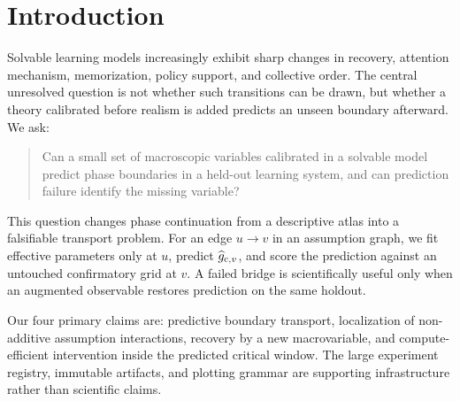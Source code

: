 \section{Introduction}

Solvable learning models increasingly exhibit sharp changes in recovery,
attention mechanism, memorization, policy support, and collective order.  The
central unresolved question is not whether such transitions can be drawn, but
whether a theory calibrated before realism is added predicts an unseen
boundary afterward.  We ask:
\begin{quote}
Can a small set of macroscopic variables calibrated in a solvable model
predict phase boundaries in a held-out learning system, and can prediction
failure identify the missing variable?
\end{quote}

This question changes phase continuation from a descriptive atlas into a
falsifiable transport problem.  For an edge $u\to v$ in an assumption graph,
we fit effective parameters only at $u$, predict $\widehat g_{{\rm c},v}$, and score the
prediction against an untouched confirmatory grid at $v$.  A failed bridge is
scientifically useful only when an augmented observable restores prediction
on the same holdout.

Our four primary claims are: predictive boundary transport, localization of
non-additive assumption interactions, recovery by a new macrovariable, and
compute-efficient intervention inside the predicted critical window.  The
large experiment registry, immutable artifacts, and plotting grammar are
supporting infrastructure rather than scientific claims.

